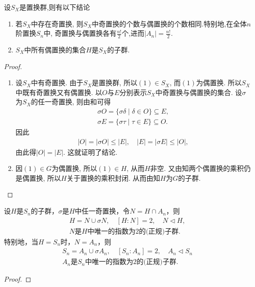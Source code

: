 \documentclass[../../main.tex]{subfiles}%
\begin{document}
\begin{theorem}\label{theorem:全体奇偶置换构成的集合的阶}
设$S_X$是置换群,则有以下结论
\begin{enumerate}[(1)]
\item\label{theorem:全体奇偶置换构成的集合的阶-1} 若$S_X$中存在奇置换, 则$S_X$中奇置换的个数与偶置换的个数相同.特别地,在全体$n$阶置换$S_n$中, 奇置换与偶置换各有$\frac{n!}{2}$个,进而$|A_n|=\frac{n!}{2}.$

\item\label{theorem:全体奇偶置换构成的集合的阶-2} $S_X$中所有偶置换的集合$H$是$S_X$的子群.
\end{enumerate}
\end{theorem}
\begin{proof}
\begin{enumerate}[(1)]
\item 设$S_X$中有奇置换. 由于$S_X$是置换群, 所以$(1) \in S_X$, 而$(1)$为偶置换. 所以$S_X$中既有奇置换又有偶置换. 以$O$与$E$分别表示$S_X$中奇置换与偶置换的集合. 设$\sigma$为$S_X$的任一奇置换, 则由和可得
\begin{align*}
\sigma O = \{\sigma\delta \mid \delta \in O\} \subseteq E, \\
\sigma E = \{\sigma\tau \mid \tau \in E\} \subseteq O.
\end{align*}
因此
\begin{align*}
|O| = |\sigma O| \leqslant |E|, \quad |E| = |\sigma E| \leqslant |O|,
\end{align*}
由此得$|O| = |E|$. 这就证明了结论.

\item 因$(1) \in G$为偶置换, 所以$(1) \in H$, 从而$H$非空. 又由知两个偶置换的乘积仍是偶置换, 所以$H$关于置换的乘积封闭. 从而由知$H$为$G$的子群.
\end{enumerate}
\end{proof}

\begin{proposition}\label{proposition:Sn的分解和An是Sn的正规子群}
设$H$是$S_n$的子群，$\sigma$是$H$中任一奇置换，令$N=H\cap A_n$，则\begin{align*}
H=N\cup \sigma N,\quad [H:N]=2,\quad N\lhd H,\\
N\text{是}H\text{中唯一的指数为}2\text{的(正规)子群}.
\end{align*}
特别地，当$H=S_n$时，$N=A_n$，则\begin{align*}
S_n=A_n\cup \sigma A_n,\quad [S_n:A_n]=2,\quad A_n\lhd S_n\\
A_n\text{是}S_n\text{中唯一的指数为}2\text{的(正规)子群}.
\end{align*}
\end{proposition}
\begin{proof}

\end{proof}
\end{document}

